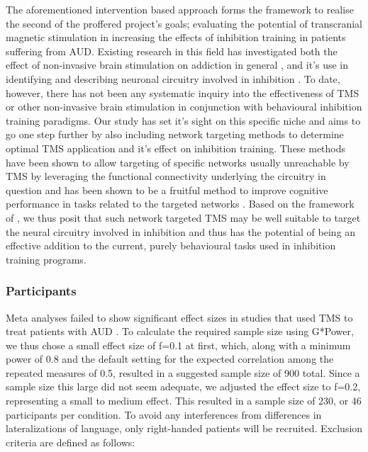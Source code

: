 \documentclass[12pt]{article}
\begin{document}
The aforementioned intervention based approach forms the framework to realise the second of the proffered project's goals; evaluating the potential of transcranial magnetic stimulation in increasing the effects of inhibition training in patients suffering from AUD. Existing research in this field has investigated both the effect of non-invasive brain stimulation on addiction in general \parencite{antonelliTranscranialMagneticStimulation2021,mostafaviNoninvasiveBrainStimulation2020,zhangEffectsRepetitiveTranscranial2019}, and it's use in identifying and describing neuronal circuitry involved in inhibition \parencite{naim-feilCorticalInhibitionMotor2016,quoilinNeuralBasesInhibitory2021}. To date, however, there has not been any systematic inquiry into the effectiveness of TMS or other non-invasive brain stimulation in conjunction with behavioural inhibition training paradigms. Our study has set it's sight on this specific niche and aims to go one step further by also including network targeting methods to determine optimal TMS application and it's effect on inhibition training. These methods have been shown to allow targeting of specific networks usually unreachable by TMS by leveraging the functional connectivity underlying the circuitry in question and has been shown to be a fruitful method to improve cognitive performance in tasks related to the targeted networks \parencite{momiCognitiveEnhancementNetworkTargeted2020}. Based on the framework of \textcite{volkowAddictionScienceUncovering2014}, we thus posit that such network targeted TMS may be well suitable to target the neural circuitry involved in inhibition and thus has the potential of being an effective addition to the current, purely behavioural tasks used in inhibition training programs.

\subsubsection{Participants}

Meta analyses failed to show significant effect sizes in studies that used TMS to treat patients with AUD \parencite{mostafaviNoninvasiveBrainStimulation2020, zhangEffectsRepetitiveTranscranial2019}. To calculate the required sample size using G*Power, we thus chose a small effect size of f=0.1 at first, which, along with a minimum power of 0.8 and the default setting for the expected correlation among the repeated measures of 0.5, resulted in a suggested sample size of 900 total. Since a sample size this large did not seem adequate, we adjusted the effect size to f=0.2, representing a small to medium effect. This resulted in a sample size of 230, or 46 participants per condition. 
To avoid any interferences from differences in lateralizations of language, only right-handed patients will be recruited. Exclusion criteria are defined as follows:
\end{document}
